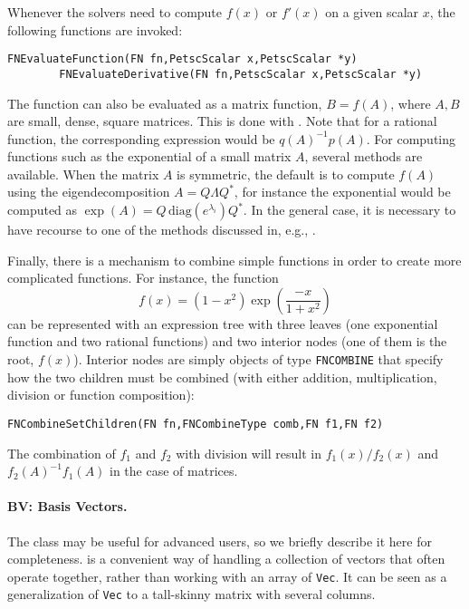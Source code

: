 Whenever the solvers need to compute $f(x)$ or $f'(x)$ on a given scalar $x$, the following functions are invoked:
	\begin{Verbatim}[fontsize=\small]
        FNEvaluateFunction(FN fn,PetscScalar x,PetscScalar *y)
        FNEvaluateDerivative(FN fn,PetscScalar x,PetscScalar *y)
	\end{Verbatim}
The function can also be evaluated as a matrix function, $B=f(A)$, where $A,B$ are small, dense, square matrices. This is done with . Note that for a rational function, the corresponding expression would be $q(A)^{-1}p(A)$.
For computing functions such as the exponential of a small matrix $A$, several methods are available. When the matrix $A$ is symmetric, the default is to compute $f(A)$ using the eigendecomposition $A=Q\Lambda Q^*$, for instance the exponential would be computed as $\exp(A)=Q\,\mathrm{diag}(e^{\lambda_i})Q^*$. In the general case, it is necessary to have recourse to one of the methods discussed in, e.g., \citep{Higham:2010:CMF}.

Finally, there is a mechanism to combine simple functions in order to create more complicated functions. For instance, the function
\begin{equation}
f(x) = (1-x^2) \exp\left( \frac{-x}{1+x^2} \right)
\end{equation}
can be represented with an expression tree with three leaves (one exponential function and two rational functions) and two interior nodes (one of them is the root, $f(x)$). Interior nodes are simply  objects of type \texttt{FNCOMBINE} that specify how the two children must be combined (with either addition, multiplication, division or function composition):
	\begin{Verbatim}[fontsize=\small]
        FNCombineSetChildren(FN fn,FNCombineType comb,FN f1,FN f2)
	\end{Verbatim}
The combination of $f_1$ and $f_2$ with division will result in $f_1(x)/f_2(x)$ and $f_2(A)^{-1}f_1(A)$ in the case of matrices.

\paragraph{BV: Basis Vectors.}

The  class may be useful for advanced users, so we briefly describe it here for completeness.  is a convenient way of handling a collection of vectors that often operate together, rather than working with an array of \texttt{Vec}. It can be seen as a generalization of \texttt{Vec} to a tall-skinny matrix with several columns.

